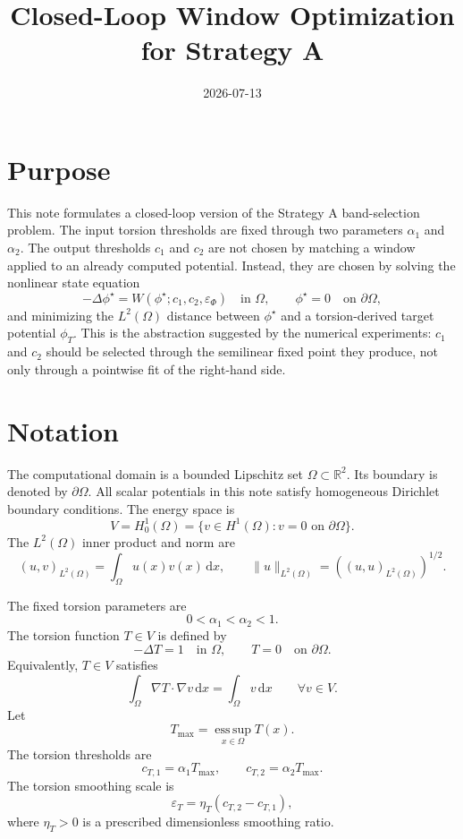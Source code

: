 \documentclass[11pt]{article}
\title{Closed-Loop Window Optimization for Strategy A}
\author{}
\date{2026-07-13}
\newcommand{\dd}{\,\mathrm d}
\newcommand{\R}{\mathbb R}
\newcommand{\OmegaD}{\Omega}
\newcommand{\V}{V}
\newcommand{\W}{W}
\newcommand{\phistar}{\phi^\star}
\newcommand{\phit}{\phi_T}
\newcommand{\epsT}{\varepsilon_T}
\newcommand{\epsp}{\varepsilon_\Phi}
\newcommand{\Honez}{H^1_0(\OmegaD)}
\begin{document}
\maketitle

\section{Purpose}

This note formulates a closed-loop version of the Strategy A band-selection
problem.  The input torsion thresholds are fixed through two parameters
\(\alpha_1\) and \(\alpha_2\).  The output thresholds \(c_1\) and \(c_2\)
are not chosen by matching a window applied to an already computed potential.
Instead, they are chosen by solving the nonlinear state equation
\[
  -\Delta \phistar = \W(\phistar;c_1,c_2,\epsp)
  \quad \text{in } \OmegaD,
  \qquad
  \phistar = 0
  \quad \text{on } \partial\OmegaD,
\]
and minimizing the \(L^2(\OmegaD)\) distance between \(\phistar\) and a
torsion-derived target potential \(\phit\).  This is the abstraction suggested
by the numerical experiments: \(c_1\) and \(c_2\) should be selected through
the semilinear fixed point they produce, not only through a pointwise fit of
the right-hand side.

\section{Notation}

The computational domain is a bounded Lipschitz set
\(\OmegaD\subset\R^2\).  Its boundary is denoted by \(\partial\OmegaD\).
All scalar potentials in this note satisfy homogeneous Dirichlet boundary
conditions.  The energy space is
\[
  \V = \Honez
  =
  \{v\in H^1(\OmegaD): v=0 \text{ on } \partial\OmegaD\}.
\]
The \(L^2(\OmegaD)\) inner product and norm are
\[
  (u,v)_{L^2(\OmegaD)}
  =
  \int_{\OmegaD} u(x)v(x)\dd x,
  \qquad
  \|u\|_{L^2(\OmegaD)}
  =
  \left((u,u)_{L^2(\OmegaD)}\right)^{1/2}.
\]

The fixed torsion parameters are
\[
  0<\alpha_1<\alpha_2<1.
\]
The torsion function \(T\in \V\) is defined by
\[
  -\Delta T = 1
  \quad \text{in } \OmegaD,
  \qquad
  T=0
  \quad \text{on } \partial\OmegaD.
\]
Equivalently, \(T\in\V\) satisfies
\[
  \int_{\OmegaD}\nabla T\cdot\nabla v\dd x
  =
  \int_{\OmegaD} v\dd x
  \qquad
  \forall v\in\V.
\]
Let
\[
  T_{\max} = \operatorname*{ess\,sup}_{x\in\OmegaD} T(x).
\]
The torsion thresholds are
\[
  c_{T,1} = \alpha_1 T_{\max},
  \qquad
  c_{T,2} = \alpha_2 T_{\max}.
\]
The torsion smoothing scale is
\[
  \epsT = \eta_T(c_{T,2}-c_{T,1}),
\]
where \(\eta_T>0\) is a prescribed dimensionless smoothing ratio.
\end{document}
